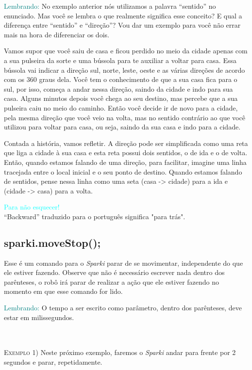     \begin{center}
        \textcolor{teal}{Lembrando:} No exemplo anterior nós utilizamos a palavra ``sentido'' no enunciado. Mas você se lembra o que realmente significa esse conceito? E qual a diferença entre ``sentido'' e ``direção''? Vou dar um exemplo para você não errar mais na hora de diferenciar os dois.
    \end{center}
    
    Vamos supor que você saiu de casa e ficou perdido no meio da cidade apenas com a sua pulseira da sorte e uma bússola para te auxiliar a voltar para casa. Essa bússola vai indicar a direção sul, norte, leste, oeste e as várias direções de acordo com os 360 graus dela. Você tem o conhecimento de que a sua casa fica para o sul, por isso, começa a andar nessa direção, saindo da cidade e indo para sua casa. Alguns minutos depois você chega ao seu destino, mas percebe que a sua pulseira caiu no meio do caminho. Então você decide ir de novo para a cidade, pela mesma direção que você veio na volta, mas no sentido contrário ao que você utilizou para voltar para casa, ou seja, saindo da sua casa e indo para a cidade. 
    
    Contada a história, vamos refletir. A direção pode ser simplificada como uma reta que liga a cidade à sua casa e esta reta possui dois sentidos, o de ida e o de volta. Então, quando estamos falando de uma direção, para facilitar, imagine uma linha tracejada entre o local inicial e o seu ponto de destino. Quando estamos falando de sentidos, pense nessa linha como uma seta (casa -> cidade) para a ida e (cidade -> casa) para a volta.

    \begin{center}
    \textcolor{cyan}{Para não esquecer!} \\ ``Backward'' traduzido para o português significa "para trás".
    \end{center}
    
    
\subsection{sparki.moveStop();}
    Esse é um comando para o \textsl{Sparki} parar de se movimentar, independente do que ele estiver fazendo. Observe que não é necessário escrever nada dentro dos parênteses, o robô irá parar de realizar a ação que ele estiver fazendo no momento em que esse comando for lido.
    
    \begin{center}
        \textcolor{teal}{Lembrando:} O tempo a ser escrito como parâmetro, dentro dos parênteses, deve estar em milissegundos.
    \end{center}
    \\
    \\
    \textsc{Exemplo 1)} Neste próximo exemplo, faremos o \textsl{Sparki} andar para frente por 2 segundos e parar, repetidamente.
    
